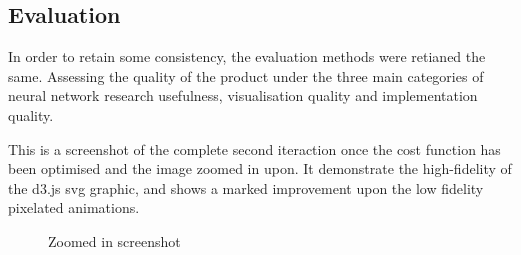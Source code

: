 \documentclass[a4paper,11pt,titlepage]{article}
\begin{document}
	\begin{figure}[H]
    			\centering	
    			\qquad
    			\caption{ }%
    			\label{fig:iter2}
	\end{figure}	


	\subsection{Evaluation}
	In order to retain some consistency, the evaluation methods were retianed the same. Assessing the quality of the product under the three main categories of neural network research usefulness, visualisation quality and implementation quality.
	\par 
	This is a screenshot of the complete second iteraction once the cost function has been optimised and the image zoomed in upon. It demonstrate the high-fidelity of the d3.js svg graphic, and shows a marked improvement upon the low fidelity pixelated animations.

	\begin{figure}[H]
    			\caption{Zoomed in screenshot}%
	\end{figure}
	
\end{document}
